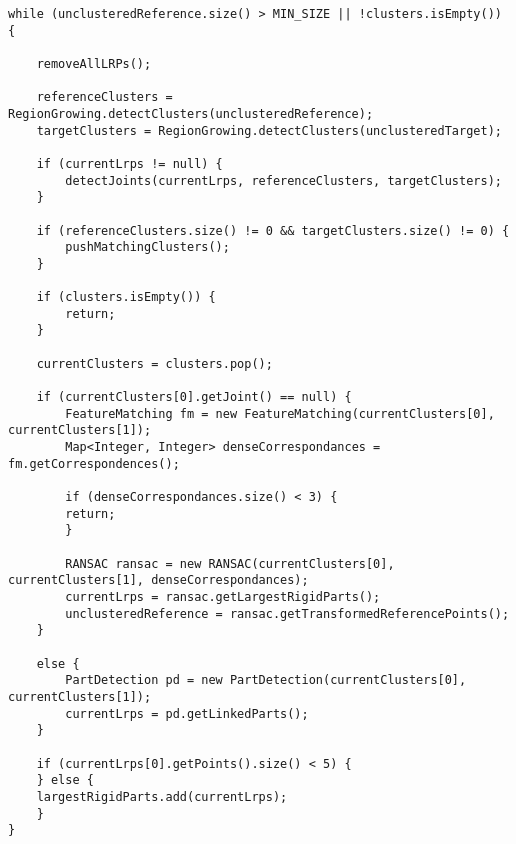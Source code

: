 \begin{lstlisting}
while (unclusteredReference.size() > MIN_SIZE || !clusters.isEmpty()) {

	removeAllLRPs();

	referenceClusters = RegionGrowing.detectClusters(unclusteredReference);
	targetClusters = RegionGrowing.detectClusters(unclusteredTarget);

	if (currentLrps != null) {
		detectJoints(currentLrps, referenceClusters, targetClusters);
	}

	if (referenceClusters.size() != 0 && targetClusters.size() != 0) {
		pushMatchingClusters();
	}

	if (clusters.isEmpty()) {
		return;
	}

	currentClusters = clusters.pop();

	if (currentClusters[0].getJoint() == null) {
		FeatureMatching fm = new FeatureMatching(currentClusters[0], currentClusters[1]);
		Map<Integer, Integer> denseCorrespondances = fm.getCorrespondences();

		if (denseCorrespondances.size() < 3) {
		return;
		}

		RANSAC ransac = new RANSAC(currentClusters[0], currentClusters[1], denseCorrespondances);
		currentLrps = ransac.getLargestRigidParts();
		unclusteredReference = ransac.getTransformedReferencePoints();
	}

	else {
		PartDetection pd = new PartDetection(currentClusters[0], currentClusters[1]);
		currentLrps = pd.getLinkedParts();
	}

	if (currentLrps[0].getPoints().size() < 5) {
	} else {
	largestRigidParts.add(currentLrps);
	}
}
\end{lstlisting}

